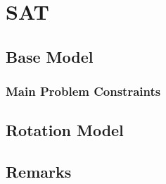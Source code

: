 \chapter{SAT}

\section{Base Model}
\subsection{Main Problem Constraints}

\section{Rotation Model}

\section{Remarks}